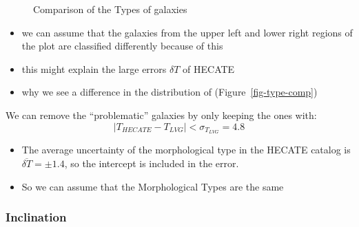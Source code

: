 \documentclass[
]{article}
\providecommand{\tightlist}{%
  \setlength{\itemsep}{0pt}\setlength{\parskip}{0pt}}\usepackage{longtable,booktabs,array}
\begin{document}
\begin{figure}
\begin{minipage}{0.50\linewidth}
{}


\end{minipage}%

\caption{\label{fig-types-compare}Comparison of the Types of galaxies}

\end{figure}%

\begin{itemize}
\tightlist
\item
  we can assume that the galaxies from the upper left and lower right
  regions of the plot are classified differently because of this
\item
  this might explain the large errors \(\delta T\) of HECATE
\item
  why we see a difference in the distribution of
  (Figure~\ref{fig-type-comp})
\end{itemize}

We can remove the ``problematic'' galaxies by only keeping the ones
with: \[
|{T_{HECATE}-T_{LVG}}|<\sigma_{T_{LVG}} = 4.8
\]

\begin{itemize}
\tightlist
\item
  The average uncertainty of the morphological type in the HECATE
  catalog is \(\overline{\delta T} = \pm 1.4\), so the intercept is
  included in the error.
\item
  So we can assume that the Morphological Types are the same
\end{itemize}

\subsubsection{Inclination}
\end{document}

